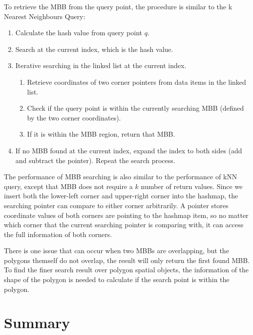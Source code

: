To retrieve the MBB from the query point, the procedure is similar to the k Nearest Neighbours Query: 
\begin{enumerate}
    \item Calculate the hash value from query point $q$.
    \item Search at the current index, which is the hash value.
    \item Iterative searching in the linked list at the current index. 
    \begin{enumerate}
        \item Retrieve coordinates of two corner pointers from data items in the linked list. 
        \item Check if the query point is within the currently searching MBB (defined by the two corner coordinates).
        \item If it is within the MBB region, return that MBB.  
    \end{enumerate}
    \item If no MBB found at the current index, expand the index to both sides (add and subtract the pointer). Repeat the search process.
\end{enumerate}

The performance of MBB searching is also similar to the performance of kNN query, except that MBB does not require a $k$ number of return values. Since we insert both the lower-left corner and upper-right corner into the hashmap, the searching pointer can compare to either corner arbitrarily. A pointer stores coordinate values of both corners are pointing to the hashmap item, so no matter which corner that the current searching pointer is comparing with, it can access the full information of both corners. 

There is one issue that can occur when two MBBs are overlapping, but the polygons themself do not overlap, the result will only return the first found MBB. To find the finer search result over polygon spatial objects, the information of the shape of the polygon is needed to calculate if the search point is within the polygon. 

\section{Summary}
